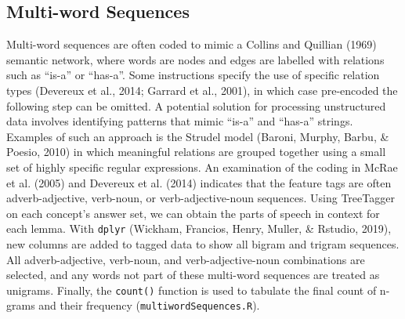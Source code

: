 \documentclass[man]{apa6}
\begin{document}
\normalsize

\hypertarget{multi-word-sequences}{%
\subsection{Multi-word Sequences}\label{multi-word-sequences}}

Multi-word sequences are often coded to mimic a Collins and Quillian (1969) semantic network, where words are nodes and edges are labelled with relations such as \enquote{is-a} or \enquote{has-a}. Some instructions specify the use of specific relation types (Devereux et al., 2014; Garrard et al., 2001), in which case pre-encoded the following step can be omitted. A potential solution for processing unstructured data involves identifying patterns that mimic \enquote{is-a} and \enquote{has-a} strings. Examples of such an approach is the Strudel model (Baroni, Murphy, Barbu, \& Poesio, 2010) in which meaningful relations are grouped together using a small set of highly specific regular expressions. An examination of the coding in McRae et al. (2005) and Devereux et al. (2014) indicates that the feature tags are often adverb-adjective, verb-noun, or verb-adjective-noun sequences. Using TreeTagger on each concept's answer set, we can obtain the parts of speech in context for each lemma. With \texttt{dplyr} (Wickham, Francios, Henry, Muller, \& Rstudio, 2019), new columns are added to tagged data to show all bigram and trigram sequences. All adverb-adjective, verb-noun, and verb-adjective-noun combinations are selected, and any words not part of these multi-word sequences are treated as unigrams. Finally, the \texttt{count()} function is used to tabulate the final count of n-grams and their frequency (\texttt{multiwordSequences.R}).

\scriptsize
\end{document}
